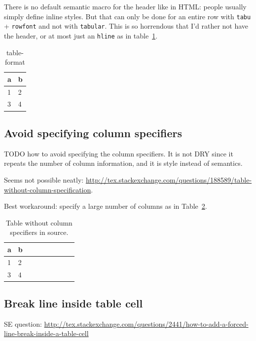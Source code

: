 \documentclass[12pt]{article}
\begin{document}
    There is no default semantic macro for the header like in HTML: people usually simply define inline styles. But that can only be done for an entire row with \lstinline|tabu| + \lstinline|rowfont| and not with \lstinline|tabular|. This is so horrendous that I'd rather not have the header, or at most just an \lstinline|hline| as in table~\ref{table-header-hline}.

    \begin{table}
      \begin{tabular}{ll}
        a & b \\
        \hline
        1 & 2 \\
        3 & 4
      \end{tabular}
      \caption{table-format}
      \label{table-header-hline}
     \end{table}

  \subsection{Avoid specifying column specifiers}\label{table-header}

    TODO how to avoid specifying the column specifiers. It is not DRY since it repeats the number of column information, and it is style instead of semantics.

    Seems not possible neatly: \url{http://tex.stackexchange.com/questions/188589/table-without-column-specification}.

    Best workaround: specify a large number of columns as in Table~\ref{tab-no-specifier}.

    \begin{table}
      \begin{tabular}{*{9}{l}}
        a & b \\
        \hline
        1 & 2 \\
        3 & 4
      \end{tabular}
      \caption{Table without column specifiers in source.}
      \label{tab-no-specifier}
     \end{table}

  \subsection{Break line inside table cell}\label{break-line-inside-table-cell}

    SE question: \url{http://tex.stackexchange.com/questions/2441/how-to-add-a-forced-line-break-inside-a-table-cell}
\end{document}
